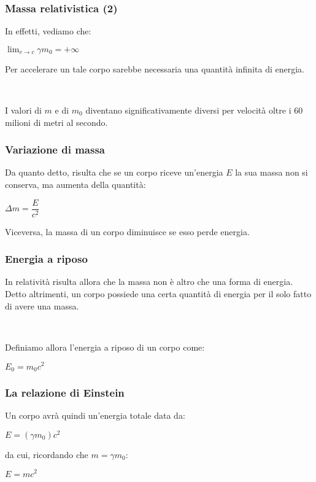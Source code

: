 \documentclass[]{beamer}
\theoremstyle{plain}
\begin{document}
\begin{frame}
\frametitle{Massa relativistica (2)}
In effetti, vediamo che:
\begin{center}
$ \displaystyle \lim_{v \to c} \gamma m_0 = + \infty $
\end{center}
Per accelerare un tale corpo sarebbe necessaria una quantità infinita di energia.\pause

~

I valori di $ m $ e di $ m_0 $ diventano significativamente diversi per velocità oltre i $ 60 $ milioni di metri al secondo.
\end{frame}

\begin{frame}
\frametitle{Variazione di massa}
Da quanto detto, risulta che se un corpo riceve un'energia $ E $ la sua massa non si conserva, ma aumenta della quantità:
\begin{center}
$ \Delta m = \dfrac{E}{c^2} $
\end{center}
Viceversa, la massa di un corpo diminuisce se esso perde energia.
\end{frame}


\begin{frame}
\frametitle{Energia a riposo}
In relatività risulta allora che la massa non è altro che una forma di energia. Detto altrimenti, un corpo possiede una certa quantità di energia per il solo fatto di avere una massa.\pause

~

Definiamo allora l'\alert{energia a riposo} di un corpo come:
\begin{center}
\colorbox{marroncino!30}{$ E_0 = m_0 c^2  $}
\end{center}
\end{frame}




\begin{frame}
\frametitle{La relazione di Einstein}
Un corpo avrà quindi un'energia totale data da:
\begin{center}
$ E = (\gamma m_0) c^2  $
\end{center}\pause
da cui, ricordando che $ m = \gamma m_0 $:
\begin{center}
\colorbox{marroncino!30}{$ E = m c^2  $}
\end{center}
\end{frame}
\end{document}
